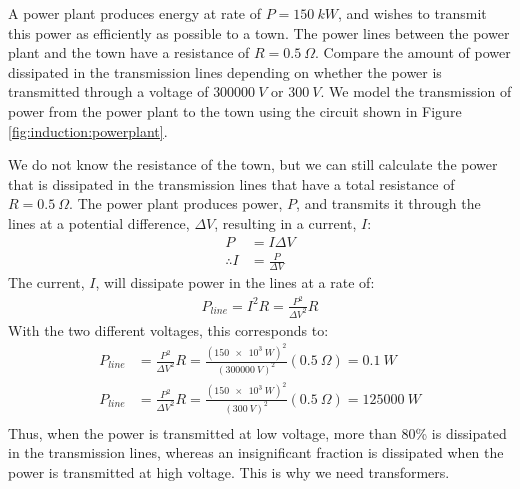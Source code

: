 \begin{example}{A power plant produces energy at rate of $P=\SI{150}{kW}$, and wishes to transmit this power as efficiently as possible to a town. The power lines between the power plant and the town have a resistance of $R=\SI{0.5}{\Omega}$. Compare the amount of power dissipated in the transmission lines depending on whether the power is transmitted through a voltage of $\SI{300000}{V}$ or $\SI{300}{V}$.}
We model the transmission of power from the power plant to the town using the circuit shown in Figure \ref{fig:induction:powerplant}.

We do not know the resistance of the town, but we can still calculate the power that is dissipated in the transmission lines that have a total resistance of $R=\SI{0.5}{\Omega}$. The power plant produces power, $P$, and transmits it through the lines at a potential difference, $\Delta V$, resulting in a current, $I$:
\begin{align*}
P &= I\Delta V\\
\therefore I &= \frac{P}{\Delta V}
\end{align*}
The current, $I$, will dissipate power in the lines at a rate of:
\begin{align*}
P_{line} = I^2 R = \frac{P^2}{\Delta V^2}R
\end{align*}
With the two different voltages, this corresponds to:
\begin{align*}
P_{line}&=\frac{P^2}{\Delta V^2}R=\frac{(\SI{150e3}{W})^2}{(\SI{300000}{V})^2}(\SI{0.5}{\Omega})=\SI{0.1}{W}\\
P_{line}&=\frac{P^2}{\Delta V^2}R=\frac{(\SI{150e3}{W})^2}{(\SI{300}{V})^2}(\SI{0.5}{\Omega})=\SI{125000}{W}\\
\end{align*}
Thus, when the power is transmitted at low voltage, more than 80\% is dissipated in the transmission lines, whereas an insignificant fraction is dissipated when the power is transmitted at high voltage. This is why we need transformers.
\end{example}

